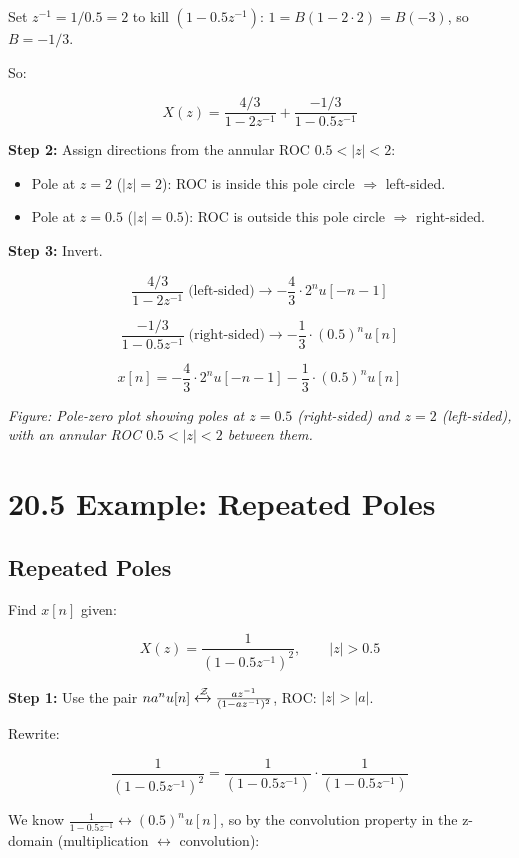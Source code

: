 \documentclass[11pt]{article}
\begin{document}
Set $z^{-1} = 1/0.5 = 2$ to kill $(1 - 0.5 z^{-1})$: $1 = B(1 - 2 \cdot 2) = B(-3)$, so $B = -1/3$.

So:

\[X(z) = \frac{4/3}{1 - 2 z^{-1}} + \frac{-1/3}{1 - 0.5 z^{-1}}\]

\textbf{Step 2:} Assign directions from the annular ROC $0.5 < |z| < 2$:

\begin{itemize}
  \item Pole at $z = 2$ ($|z| = 2$): ROC is inside this pole circle $\Rightarrow$ left-sided.
  \item Pole at $z = 0.5$ ($|z| = 0.5$): ROC is outside this pole circle $\Rightarrow$ right-sided.
\end{itemize}

\textbf{Step 3:} Invert.

\[\frac{4/3}{1 - 2 z^{-1}} \;\text{(left-sided)} \longrightarrow -\frac{4}{3} \cdot 2^n u[-n-1]\]

\[\frac{-1/3}{1 - 0.5 z^{-1}} \;\text{(right-sided)} \longrightarrow -\frac{1}{3} \cdot (0.5)^n u[n]\]

\[x[n] = -\frac{4}{3} \cdot 2^n u[-n-1] - \frac{1}{3} \cdot (0.5)^n u[n]\]

\textit{Figure: Pole-zero plot showing poles at $z = 0.5$ (right-sided) and $z = 2$ (left-sided), with an annular ROC $0.5 < |z| < 2$ between them.}

\section*{20.5 Example: Repeated Poles}

\subsection*{Repeated Poles}

Find $x[n]$ given:

\[X(z) = \frac{1}{(1 - 0.5 z^{-1})^2}, \qquad |z| > 0.5\]

\textbf{Step 1:} Use the pair $n a^n u[n] \xleftrightarrow{\mathcal{Z}} \frac{a z^{-1}}{(1 - a z^{-1})^2}$, ROC: $|z| > |a|$.

Rewrite:

\[\frac{1}{(1 - 0.5 z^{-1})^2} = \frac{1}{(1 - 0.5 z^{-1})} \cdot \frac{1}{(1 - 0.5 z^{-1})}\]

We know $\frac{1}{1 - 0.5 z^{-1}} \leftrightarrow (0.5)^n u[n]$, so by the convolution property in the z-domain (multiplication $\leftrightarrow$ convolution):
\end{document}
